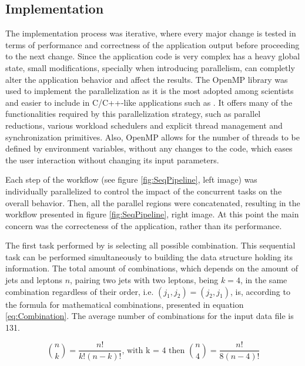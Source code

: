 \subsection{Implementation}
\label{SharedMemImplementation}

The implementation process was iterative, where every major change is tested in terms of performance and correctness of the application output before proceeding to the next change. Since the application code is very complex has a heavy global state, small modifications, specially when introducing parallelism, can completly alter the application behavior and affect the results. The OpenMP library was used to implement the parallelization as it is the most adopted among scientists and easier to include in C/C++-like applications such as \tth. It offers many of the functionalities required by this parallelization strategy, such as parallel reductions, various workload schedulers and explicit thread management and synchronization primitives. Also, OpenMP allows for the number of threads to be defined by environment variables, without any changes to the code, which eases the user interaction without changing its input parameters.

Each step of the \ttDilepKinFit workflow (see figure \ref{fig:SeqPipeline}, left image) was individually parallelized to control the impact of the concurrent tasks on the overall behavior. Then, all the parallel regions were concatenated, resulting in the workflow presented in figure \ref{fig:SeqPipeline}, right image. At this point the main concern was the correcteness of the application, rather than its performance.

The first task performed by \ttDilepKinFit is selecting all possible combination. This sequential task can be performed simultaneously to building the data structure holding its information. The total amount of combinations, which depends on the amount of jets and leptons $n$, pairing two jets with two leptons, being $k = 4$, in the same combination regardless of their order, i.e. $(j_1, j_2) = (j_2, j_1)$, is, according to the formula for mathematical combinations, presented in equation \ref{eq:Combination}. The average number of combinations for the input data file is 131.

\begin{center}
	\begin{equation}
		\binom{n}{k} = \frac{n!}{k!(n - k)!} \mbox{, with k = 4 then } \binom{n}{4} = \frac{n!}{8(n - 4)!}
		\label{eq:Combination}
	\end{equation}
\end{center}

